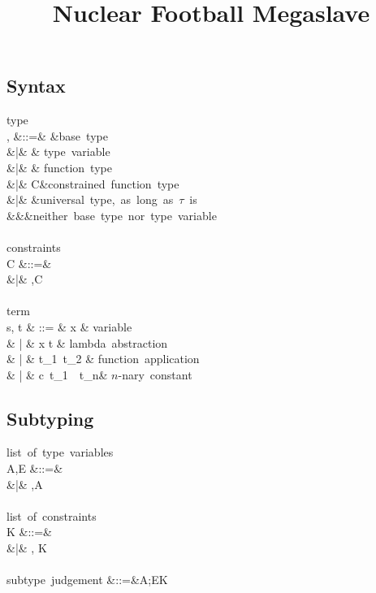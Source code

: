 \documentclass{amsart}
\title{Nuclear Football Megaslave}
\theoremstyle{definition}
\begin{document}
\maketitle
\tableofcontents

\subsection{Syntax}
\label{syntax}
\begin{syntax}
\mbox{type}\\
\sigma, \tau
&::=& \iota &\mbox{base type}\\
&|& \alpha & \mbox{type variable} \\
&|& \tau \rightarrow \tau & \mbox{function type} \\
&|& \tau\R\tau\Given C&\mbox{constrained function type}\\
&|& \All\alpha\tau&\mbox{universal type, as long as $\tau$ is}\\
&&&\quad\mbox{neither base type nor type variable}
\\
\\
\mbox{constraints}\\
C
&::=&\emptyset\\
&|& \tau\Sub\tau,C
\\
\\
\mbox{term}\\
s, t & ::= & x & \mbox{variable} \\
& | & \Abs x t  & \mbox{lambda abstraction} \\
& | & t_1~t_2 & \mbox{function application} \\
& | & c~t_1~\cdots~t_n& \mbox{$n$-nary constant}
\end{syntax}

\subsection{Subtyping}

\begin{syntax}
\mbox{list of type variables}\\
A,E
&::=& \emptyset \\
&|& \alpha,A
\\
\\
\mbox{list of constraints}\\
K
&::=& \emptyset \\
&|& \sigma \Sub \tau, K
\\
\\
\mbox{subtype judgement}
&::=&A;E\vdash K
\end{syntax}
\end{document}
